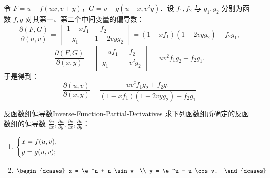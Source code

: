 \begin{solution}

    令 $F = u - f(ux, v + y)$，$G = v - g(u - x, v^2y)$．设 $f_1, f_2$ 与 $g_1, g_2$ 分别为函数 $f, g$ 对其第一、第二个中间变量的偏导数：
    \begin{equation}
        \frac{\partial(F,G)}{\partial(u,v)} =
        \begin{vmatrix}
            1 - xf_1 & -f_2       \\
            -g_1     & 1 - 2vyg_2
        \end{vmatrix} = (1 - xf_1)(1 - 2vyg_2) - f_2g_1,
    \end{equation}
    \begin{equation}
        \frac{\partial(F,G)}{\partial(x,y)} =
        \begin{vmatrix}
            -uf_1 & -f_2    \\
            g_1   & -v^2g_2
        \end{vmatrix} = uv^2f_1g_2 + f_2g_1.
    \end{equation}
    于是得到：
    \begin{equation}
        \boxed{\frac{\partial(u,v)}{\partial(x,y)} = \frac{uv^2f_1g_2 + f_2g_1}{(1 - xf_1)(1 - 2vyg_2) - f_2g_1}}
    \end{equation}
\end{solution}


\begin{problem}{反函数组偏导数}{Inverse-Function-Partial-Derivatives}
    求下列函数组所确定的反函数组的偏导数 $\frac{\partial u}{\partial x}, \frac{\partial u}{\partial y}, \frac{\partial v}{\partial x}, \frac{\partial v}{\partial y}$：
    \begin{enumerate}
        \item $\begin{dcases} x = f(u, v), \\ y = g(u, v); \end{dcases}$
        \item $\begin{dcases} x = \e^u + u \sin v, \\ y = \e^u - u \cos v. \end{dcases}$
    \end{enumerate}
\end{problem}

